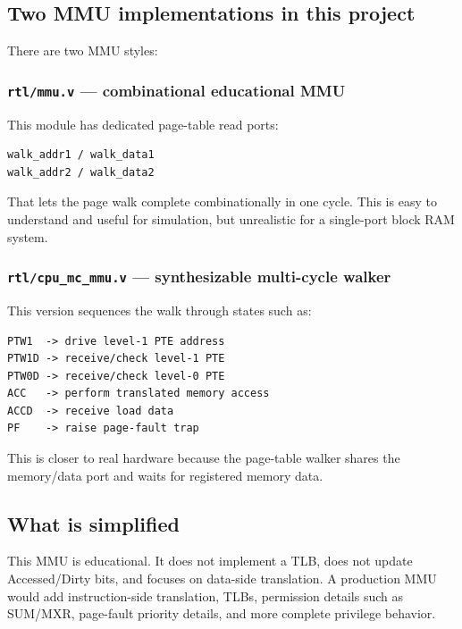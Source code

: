 \subsection{Two MMU implementations in this project}

There are two MMU styles:

\subsubsection{\texttt{rtl/mmu.v} — combinational educational MMU}

This module has dedicated page-table read ports:

\begin{lstlisting}[language={}]
walk_addr1 / walk_data1
walk_addr2 / walk_data2
\end{lstlisting}

That lets the page walk complete combinationally in one cycle. This is easy to understand and useful for simulation, but unrealistic for a single-port block RAM system.

\subsubsection{\texttt{rtl/cpu\_mc\_mmu.v} — synthesizable multi-cycle walker}

This version sequences the walk through states such as:

\begin{lstlisting}[language={}]
PTW1  -> drive level-1 PTE address
PTW1D -> receive/check level-1 PTE
PTW0D -> receive/check level-0 PTE
ACC   -> perform translated memory access
ACCD  -> receive load data
PF    -> raise page-fault trap
\end{lstlisting}

This is closer to real hardware because the page-table walker shares the memory/data port and waits for registered memory data.

\subsection{What is simplified}

This MMU is educational. It does not implement a TLB, does not update Accessed/Dirty bits, and focuses on data-side translation. A production MMU would add instruction-side translation, TLBs, permission details such as SUM/MXR, page-fault priority details, and more complete privilege behavior.

\bigskip
